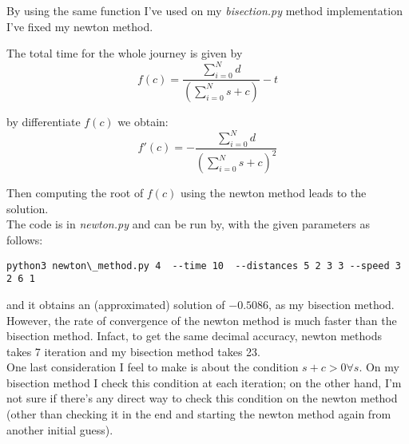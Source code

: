 \documentclass[12pt]{article}
\begin{document}

%
By using the same function I've used on my \textit{bisection.py} method implementation I've fixed my newton method. 

The total time for the whole journey is given by \\

$$f(c) = \frac{\sum_{i=0}^N d}{( \sum_{i=0}^N s + c)} - t $$

by differentiate $f(c)$ we obtain: \\

$$f'(c) = -\frac{\sum_{i=0}^N d}{( \sum_{i=0}^N s + c)^2}$$
 
Then computing the root of $f(c)$ using the newton method leads to the solution. \\ 

The code is in \textit{newton.py} and can be run by, with the given parameters as follows: \\
\begin{lstlisting}
python3 newton\_method.py 4  --time 10  --distances 5 2 3 3 --speed 3 2 6 1	
\end{lstlisting}
and it obtains an (approximated) solution of $-0.5086$, as my bisection method. However, the rate of convergence of the newton method is much faster than the bisection method. Infact, to get the same decimal accuracy, newton methods takes 7 iteration and my bisection method takes 23. \\

One last consideration I feel to make is about the condition $s + c > 0 \forall s$. On my bisection method I check this condition at each iteration; on the other hand, I'm not sure if there's any direct way to check this condition on the newton method (other than checking it in the end and starting the newton method again from another initial guess). \\


\\
\end{document}
